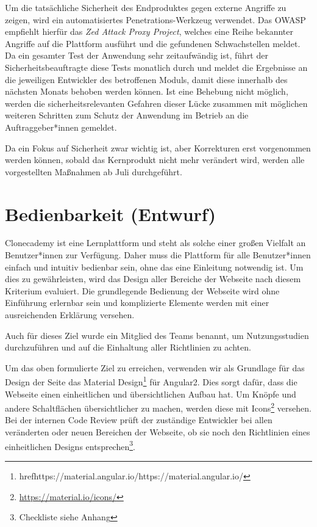 \documentclass[accentcolor=tud0b,12pt,paper=a4]{tudreport}
\begin{document}
Um die tatsächliche Sicherheit des Endproduktes gegen externe Angriffe zu zeigen, wird ein automatisiertes Penetrations-Werkzeug verwendet. Das OWASP empfiehlt hierfür das \emph{Zed Attack Proxy Project}, welches eine Reihe bekannter Angriffe auf die Plattform ausführt und die gefundenen Schwachstellen meldet. Da ein gesamter Test der Anwendung sehr zeitaufwändig ist, führt der Sicherheitsbeauftragte diese Tests monatlich durch und meldet die Ergebnisse an die jeweiligen Entwickler des betroffenen Moduls, damit diese innerhalb des nächsten Monats behoben werden können. Ist eine Behebung nicht möglich, werden die sicherheitsrelevanten Gefahren dieser Lücke zusammen mit möglichen weiteren Schritten zum Schutz der Anwendung im Betrieb an die Auftraggeber*innen gemeldet.

Da ein Fokus auf Sicherheit zwar wichtig ist, aber Korrekturen erst vorgenommen werden können, sobald das Kernprodukt nicht mehr verändert wird, werden alle vorgestellten Maßnahmen ab Juli durchgeführt.

\section{Bedienbarkeit (Entwurf)}
Clonecademy ist eine Lernplattform und steht als solche einer großen Vielfalt an Benutzer*innen zur Verfügung. Daher muss die Plattform für alle Benutzer*innen einfach und intuitiv bedienbar sein, ohne das eine Einleitung notwendig ist. Um dies zu gewährleisten, wird das Design aller Bereiche der Webseite nach diesem Kriterium evaluiert. Die grundlegende Bedienung der Webseite wird ohne Einführung erlernbar sein und komplizierte Elemente werden mit einer ausreichenden Erklärung versehen.

Auch für dieses Ziel wurde ein Mitglied des Teams benannt, um Nutzungsstudien durchzuführen und auf die Einhaltung aller Richtlinien zu achten.

Um das oben formulierte Ziel zu erreichen, verwenden wir als Grundlage für das Design der Seite das Material Design\footnote{href{https://material.angular.io/}{https://material.angular.io/}} für Angular2. Dies sorgt dafür, dass die Webseite einen einheitlichen und übersichtlichen Aufbau hat. Um Knöpfe und andere Schaltflächen übersichtlicher zu machen, werden diese mit Icons\footnote{\href{https://material.io/icons/}{https://material.io/icons/}} versehen. Bei der internen Code Review prüft der zuständige Entwickler bei allen veränderten oder neuen Bereichen der Webseite, ob sie noch den Richtlinien eines einheitlichen Designs entsprechen\footnote{Checkliste siehe Anhang}.
\end{document}
